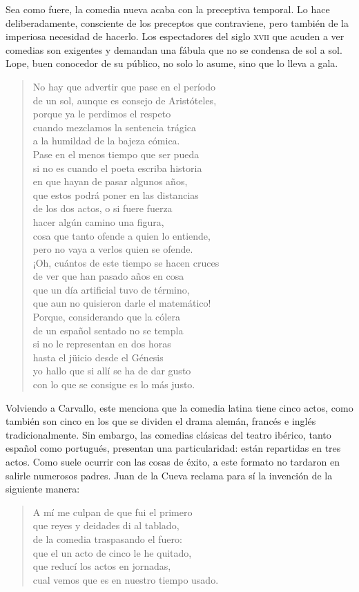 Sea como fuere, la comedia nueva acaba con la preceptiva temporal. Lo hace deliberadamente, consciente de los preceptos que contraviene, pero también de la imperiosa necesidad de hacerlo. Los espectadores del siglo \textsc{xvii} que acuden a ver comedias son exigentes y demandan una fábula que no se condensa de sol a sol. Lope, buen conocedor de su público, no solo lo asume, sino que lo lleva a gala.

\blockquote{No hay que advertir que pase en el período\\de un sol, aunque es consejo de Aristóteles,\\porque ya le perdimos el respeto\\cuando mezclamos la sentencia trágica\\a la humildad de la bajeza cómica.\\Pase en el menos tiempo que ser pueda\\si no es cuando el poeta escriba historia\\en que hayan de pasar algunos años,\\que estos podrá poner en las distancias\\de los dos actos, o si fuere fuerza\\hacer algún camino una figura,\\cosa que tanto ofende a quien lo entiende,\\pero no vaya a verlos quien se ofende.\\¡Oh, cuántos de este tiempo se hacen cruces\\de ver que han pasado años en cosa\\que un día artificial tuvo de término,\\que aun no quisieron darle el matemático!\\Porque, considerando que la cólera\\de un español sentado no se templa\\si no le representan en dos horas\\hasta el jüicio desde el Génesis\\yo hallo que si allí se ha de dar gusto\\con lo que se consigue es lo más justo. \parencite[189-210]{vega2006}}

Volviendo a Carvallo, este menciona que la comedia latina tiene cinco actos, como también son cinco en los que se dividen el drama alemán, francés e inglés tradicionalmente. Sin embargo, las comedias clásicas del teatro ibérico, tanto español como portugués, presentan una particularidad: están repartidas en tres actos. Como suele ocurrir con las cosas de éxito, a este formato no tardaron en salirle numerosos padres. Juan de la Cueva reclama para sí la invención de la siguiente manera:
\blockquote{A mí me culpan de que fui el primero\\que reyes y deidades di al tablado,\\de la comedia traspasando el fuero:\\que el un acto de cinco le he quitado,\\que reducí los actos en jornadas,\\cual vemos que es en nuestro tiempo usado. \parencite[cit. en][143]{sanchez1972}}

